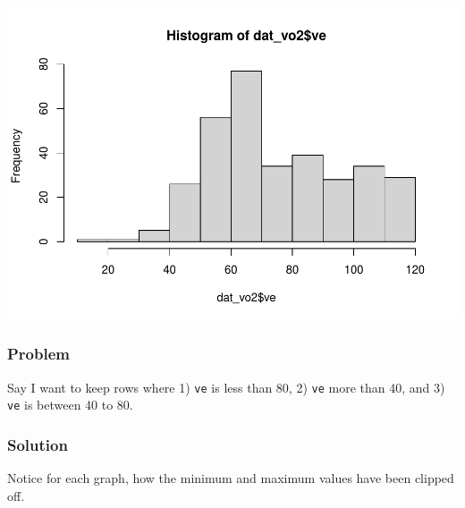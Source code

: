 \documentclass[
]{book}
\newenvironment{Shaded}{\begin{snugshade}}{\end{snugshade}}
\newcommand{\CommentTok}[1]{\textcolor[rgb]{0.56,0.35,0.01}{\textit{#1}}}
\newcommand{\DecValTok}[1]{\textcolor[rgb]{0.00,0.00,0.81}{#1}}
\newcommand{\FunctionTok}[1]{\textcolor[rgb]{0.00,0.00,0.00}{#1}}
\newcommand{\NormalTok}[1]{#1}
\newcommand{\OtherTok}[1]{\textcolor[rgb]{0.56,0.35,0.01}{#1}}
\newcommand{\SpecialCharTok}[1]{\textcolor[rgb]{0.00,0.00,0.00}{#1}}
\begin{document}
\includegraphics{se201_stats_book_files/figure-latex/unnamed-chunk-111-1.pdf}

\hypertarget{problem-11}{%
\subsubsection{Problem}\label{problem-11}}

Say I want to keep rows where 1) \texttt{ve} is less than 80, 2) \texttt{ve} more than 40, and 3) \texttt{ve} is between 40 to 80.

\hypertarget{solution-11}{%
\subsubsection{Solution}\label{solution-11}}

Notice for each graph, how the minimum and maximum values have been clipped off.

\begin{Shaded}
\end{Shaded}
\end{document}
